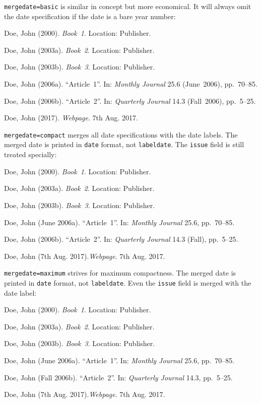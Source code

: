 \documentclass[a4paper]{article}
\newenvironment{bibsample}
  {\trivlist\samepage
   \setlength{\itemsep}{0pt}}
  {\endtrivlist}
\begin{document}
\texttt{mergedate=basic} is similar in concept but more economical.
It will always omit the date specification if the date is a bare year
number:

\begin{bibsample}
\item Doe, John (2000). \emph{Book~1}. Location: Publisher.
\item Doe, John (2003a). \emph{Book~2}. Location: Publisher.
\item Doe, John (2003b). \emph{Book~3}. Location: Publisher.
\item Doe, John (2006a). \enquote{Article~1}. In: \emph{Monthly Journal} 25.6
(June~2006), pp.~70--85.
\item Doe, John (2006b). \enquote{Article~2}. In: \emph{Quarterly Journal} 14.3
(Fall~2006), pp.~5--25.
\item Doe, John (2017). \emph{Webpage}. 7th Aug. 2017.
\end{bibsample}

\texttt{mergedate=compact} merges all date specifications with the
date labels. The merged date is printed in \texttt{date} format,
not \texttt{labeldate}. The \texttt{issue} field is still treated specially:

\begin{bibsample}
\item Doe, John (2000). \emph{Book~1}. Location: Publisher.
\item Doe, John (2003a). \emph{Book~2}. Location: Publisher.
\item Doe, John (2003b). \emph{Book~3}. Location: Publisher.
\item Doe, John (June 2006a). \enquote{Article~1}. In: \emph{Monthly Journal} 25.6, pp.~70--85.
\item Doe, John (2006b). \enquote{Article~2}. In: \emph{Quarterly Journal} 14.3
(Fall), pp.~5--25.
\item Doe, John (7th Aug. 2017).\emph{Webpage}. 7th Aug. 2017.
\end{bibsample}

\texttt{mergedate=maximum} strives for maximum compactness.
The merged date is printed in \texttt{date} format, not
\texttt{labeldate}.
Even the \texttt{issue} field is merged with the date label:

\begin{bibsample}
\item Doe, John (2000). \emph{Book~1}. Location: Publisher.
\item Doe, John (2003a). \emph{Book~2}. Location: Publisher.
\item Doe, John (2003b). \emph{Book~3}. Location: Publisher.
\item Doe, John (June 2006a). \enquote{Article~1}. In: \emph{Monthly Journal} 25.6, pp.~70--85.
\item Doe, John (Fall 2006b). \enquote{Article~2}. In: \emph{Quarterly Journal} 14.3, pp.~5--25.
\item Doe, John (7th Aug. 2017).\emph{Webpage}. 7th Aug. 2017.
\end{bibsample}
\end{document}
